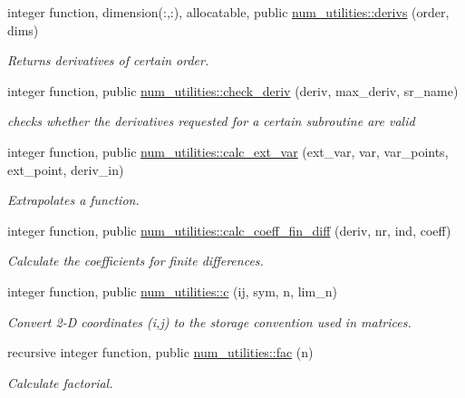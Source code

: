 \begin{DoxyCompactItemize}
integer function, dimension(\+:,\+:), allocatable, public \hyperlink{namespacenum__utilities_ac827c18dd05a9b5a06675eac942f3b51}{num\+\_\+utilities\+::derivs} (order, dims)
\begin{DoxyCompactList}\small\item\em Returns derivatives of certain order. \end{DoxyCompactList}\item 
integer function, public \hyperlink{namespacenum__utilities_a00f4cfe18a734eaa5d66f529e52f7c31}{num\+\_\+utilities\+::check\+\_\+deriv} (deriv, max\+\_\+deriv, sr\+\_\+name)
\begin{DoxyCompactList}\small\item\em checks whether the derivatives requested for a certain subroutine are valid \end{DoxyCompactList}\item 
integer function, public \hyperlink{namespacenum__utilities_a2d5d9c66db19fb6edeeb50db6182397f}{num\+\_\+utilities\+::calc\+\_\+ext\+\_\+var} (ext\+\_\+var, var, var\+\_\+points, ext\+\_\+point, deriv\+\_\+in)
\begin{DoxyCompactList}\small\item\em Extrapolates a function. \end{DoxyCompactList}\item 
integer function, public \hyperlink{namespacenum__utilities_a4dffe3beba7165dd17cff19a99a9e2ac}{num\+\_\+utilities\+::calc\+\_\+coeff\+\_\+fin\+\_\+diff} (deriv, nr, ind, coeff)
\begin{DoxyCompactList}\small\item\em Calculate the coefficients for finite differences. \end{DoxyCompactList}\item 
integer function, public \hyperlink{namespacenum__utilities_a5ee3fbd1fe67d0deefc7194631389f2a}{num\+\_\+utilities\+::c} (ij, sym, n, lim\+\_\+n)
\begin{DoxyCompactList}\small\item\em Convert 2-\/D coordinates (i,j) to the storage convention used in matrices. \end{DoxyCompactList}\item 
recursive integer function, public \hyperlink{namespacenum__utilities_a43ab60f9e202b55221373286a5bbb954}{num\+\_\+utilities\+::fac} (n)
\begin{DoxyCompactList}\small\item\em Calculate factorial. \end{DoxyCompactList}\item 

\end{DoxyCompactItemize}
